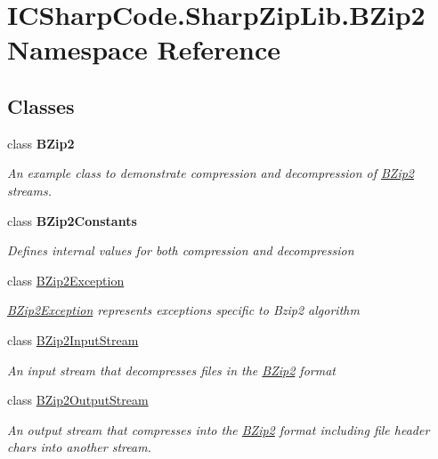 \hypertarget{namespace_i_c_sharp_code_1_1_sharp_zip_lib_1_1_b_zip2}{}\section{I\+C\+Sharp\+Code.\+Sharp\+Zip\+Lib.\+B\+Zip2 Namespace Reference}
\label{namespace_i_c_sharp_code_1_1_sharp_zip_lib_1_1_b_zip2}
\subsection*{Classes}
\begin{DoxyCompactItemize}
\item 
class {\bfseries B\+Zip2}
\begin{DoxyCompactList}\small\item\em An example class to demonstrate compression and decompression of \hyperlink{namespace_i_c_sharp_code_1_1_sharp_zip_lib_1_1_b_zip2}{B\+Zip2} streams. \end{DoxyCompactList}\item 
class {\bfseries B\+Zip2\+Constants}
\begin{DoxyCompactList}\small\item\em Defines internal values for both compression and decompression \end{DoxyCompactList}\item 
class \hyperlink{class_i_c_sharp_code_1_1_sharp_zip_lib_1_1_b_zip2_1_1_b_zip2_exception}{B\+Zip2\+Exception}
\begin{DoxyCompactList}\small\item\em \hyperlink{class_i_c_sharp_code_1_1_sharp_zip_lib_1_1_b_zip2_1_1_b_zip2_exception}{B\+Zip2\+Exception} represents exceptions specific to Bzip2 algorithm \end{DoxyCompactList}\item 
class \hyperlink{class_i_c_sharp_code_1_1_sharp_zip_lib_1_1_b_zip2_1_1_b_zip2_input_stream}{B\+Zip2\+Input\+Stream}
\begin{DoxyCompactList}\small\item\em An input stream that decompresses files in the \hyperlink{namespace_i_c_sharp_code_1_1_sharp_zip_lib_1_1_b_zip2}{B\+Zip2} format \end{DoxyCompactList}\item 
class \hyperlink{class_i_c_sharp_code_1_1_sharp_zip_lib_1_1_b_zip2_1_1_b_zip2_output_stream}{B\+Zip2\+Output\+Stream}
\begin{DoxyCompactList}\small\item\em An output stream that compresses into the \hyperlink{namespace_i_c_sharp_code_1_1_sharp_zip_lib_1_1_b_zip2}{B\+Zip2} format including file header chars into another stream. \end{DoxyCompactList}\end{DoxyCompactItemize}
